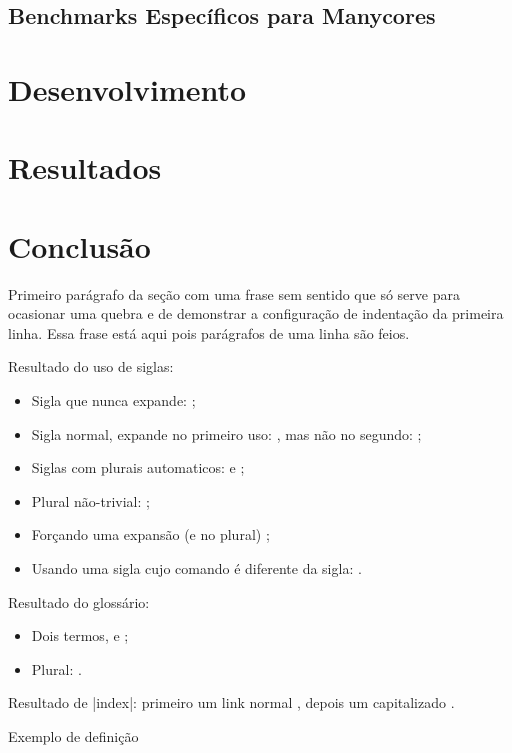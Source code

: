 \section{Benchmarks Específicos para Manycores}
\label{sec:benchpramanycores}

\chapter{Desenvolvimento}
\label{ch:desenvolvimento}

\chapter{Resultados}
\label{ch:resultados}

\chapter{Conclusão}
\label{ch:conclusao}

 Primeiro parágrafo da seção com uma frase sem sentido que só serve para ocasionar uma quebra e de demonstrar a configuração de indentação da primeira linha. Essa frase está aqui pois parágrafos de uma linha são feios.

Resultado do uso de siglas:
\begin{itemize}
\item Sigla que nunca expande: \API;
\item Sigla normal, expande no primeiro uso: \DHT, mas não no segundo: \DHT;
\item Siglas com plurais automaticos: \APIs e \DHTs;
\item Plural não-trivial: \SQs;
\item Forçando uma expansão (e no plural) ;
\item Usando uma sigla cujo comando é diferente da sigla: \WTC.
\end{itemize}

Resultado do glossário:
\begin{itemize}
\item Dois termos, \polling e \proxy;
\item Plural: \proxys.
\end{itemize}

Resultado de \mla|index|: primeiro um link normal , depois um capitalizado .

\begin{defn}
  Exemplo de definição
\end{defn}

